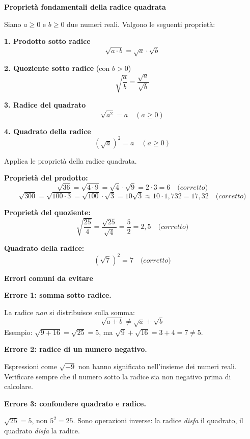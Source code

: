 \begin{regola}
    \textbf{Proprietà fondamentali della radice quadrata}

    Siano \(a \geq 0\) e \(b \geq 0\) due numeri reali. Valgono le seguenti proprietà:

    \medskip

    \textbf{1. Prodotto sotto radice}
    \[
        \sqrt{a \cdot b} = \sqrt{a} \cdot \sqrt{b}
    \]

    \textbf{2. Quoziente sotto radice} \quad (con \(b > 0\))
    \[
        \sqrt{\dfrac{a}{b}} = \dfrac{\sqrt{a}}{\sqrt{b}}
    \]

    \textbf{3. Radice del quadrato}
    \[
        \sqrt{a^2} = a \quad (a \geq 0)
    \]

    \textbf{4. Quadrato della radice}
    \[
        \left(\sqrt{a}\right)^2 = a \quad (a \geq 0)
    \]
\end{regola}

\begin{esempio}
    Applica le proprietà della radice quadrata.

    \medskip

    \textbf{Proprietà del prodotto:}
    \[
        \sqrt{36} = \sqrt{4 \cdot 9} = \sqrt{4} \cdot \sqrt{9} = 2 \cdot 3 = 6
        \quad \textit{(corretto)}
    \]
    \[
        \sqrt{300} = \sqrt{100 \cdot 3} = \sqrt{100} \cdot \sqrt{3}
        = 10\sqrt{3} \approx 10 \cdot 1{,}732 = 17{,}32
        \quad \textit{(corretto)}
    \]

    \textbf{Proprietà del quoziente:}
    \[
        \sqrt{\frac{25}{4}} = \frac{\sqrt{25}}{\sqrt{4}} = \frac{5}{2} = 2{,}5
        \quad \textit{(corretto)}
    \]

    \textbf{Quadrato della radice:}
    \[
        \left(\sqrt{7}\right)^2 = 7
        \quad \textit{(corretto)}
    \]
\end{esempio}

\begin{attenzione}
    \textbf{Errori comuni da evitare}

    \medskip

    \textbf{Errore 1: somma sotto radice.}

    La radice \emph{non} si distribuisce sulla somma:
    \[
        \sqrt{a + b} \neq \sqrt{a} + \sqrt{b}
    \]
    Esempio: \(\sqrt{9 + 16} = \sqrt{25} = 5\), ma
    \(\sqrt{9} + \sqrt{16} = 3 + 4 = 7 \neq 5\).

    \medskip

    \textbf{Errore 2: radice di un numero negativo.}

    Espressioni come \(\sqrt{-9}\) non hanno significato nell'insieme dei
    numeri reali. Verificare sempre che il numero sotto la radice sia
    non negativo prima di calcolare.

    \medskip

    \textbf{Errore 3: confondere quadrato e radice.}

    \(\sqrt{25} = 5\), non \(5^2 = 25\). Sono operazioni inverse: la radice
    \emph{disfa} il quadrato, il quadrato \emph{disfa} la radice.
\end{attenzione}

